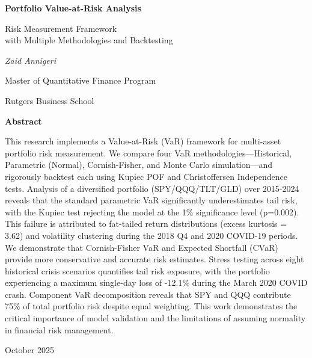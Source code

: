\documentclass[12pt,a4paper]{article}
\begin{document}
\begin{titlepage}
    \centering
    \vspace*{2cm}

    {\Huge\bfseries\color{black} Portfolio Value-at-Risk Analysis\par}
    \vspace{0.5cm}
    {\Large Risk Measurement Framework \\ with Multiple Methodologies and Backtesting\par}

    \vspace{2cm}

    {\Large\itshape Zaid Annigeri\par}
    \vspace{0.5cm}
    {\large Master of Quantitative Finance Program\par}
    {\large Rutgers Business School\par}

    \vfill

    {\large \textbf{Abstract}\par}
    \vspace{0.5cm}
    \begin{minipage}{0.85\textwidth}
        \small
        This research implements a Value-at-Risk (VaR) framework for multi-asset portfolio risk measurement. We compare four VaR methodologies—Historical, Parametric (Normal), Cornish-Fisher, and Monte Carlo simulation—and rigorously backtest each using Kupiec POF and Christoffersen Independence tests. Analysis of a diversified portfolio (SPY/QQQ/TLT/GLD) over 2015-2024 reveals that the standard parametric VaR significantly underestimates tail risk, with the Kupiec test rejecting the model at the 1\% significance level (p=0.002). This failure is attributed to fat-tailed return distributions (excess kurtosis = 3.62) and volatility clustering during the 2018 Q4 and 2020 COVID-19 periods. We demonstrate that Cornish-Fisher VaR and Expected Shortfall (CVaR) provide more conservative and accurate risk estimates. Stress testing across eight historical crisis scenarios quantifies tail risk exposure, with the portfolio experiencing a maximum single-day loss of -12.1\% during the March 2020 COVID crash. Component VaR decomposition reveals that SPY and QQQ contribute 75\% of total portfolio risk despite equal weighting. This work demonstrates the critical importance of model validation and the limitations of assuming normality in financial risk management.
    \end{minipage}

    \vfill

    {\large October 2025\par}
\end{titlepage}
\end{document}
